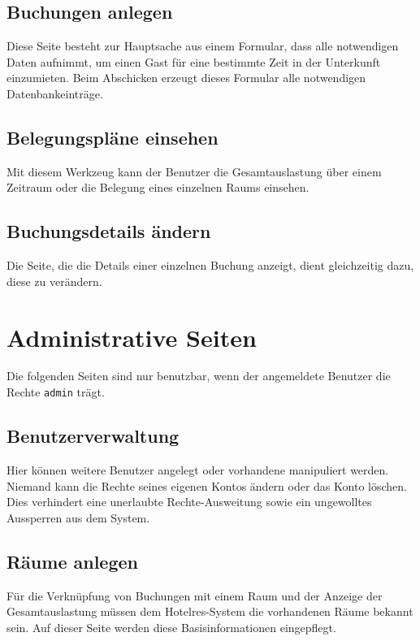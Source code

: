 \documentclass[a4paper,oneside,10pt]{scrreprt}
\begin{document}
\subsection*{Buchungen anlegen}

Diese Seite besteht zur Hauptsache aus einem Formular, dass alle notwendigen Daten aufnimmt, um einen Gast für eine bestimmte Zeit in der Unterkunft einzumieten. Beim Abschicken erzeugt dieses Formular alle notwendigen Datenbankeinträge.

\subsection*{Belegungspläne einsehen}

Mit diesem Werkzeug kann der Benutzer die Gesamtauslastung über einem Zeitraum oder die Belegung eines einzelnen Raums einsehen.

\subsection*{Buchungsdetails ändern}

Die Seite, die die Details einer einzelnen Buchung anzeigt, dient gleichzeitig dazu, diese zu verändern.


\section{Administrative Seiten}

Die folgenden Seiten sind nur benutzbar, wenn der angemeldete Benutzer die Rechte \texttt{admin} trägt.

\subsection*{Benutzerverwaltung}

Hier können weitere Benutzer angelegt oder vorhandene manipuliert werden. Niemand kann die Rechte seines eigenen Kontos ändern oder das Konto löschen. Dies verhindert eine unerlaubte Rechte-Ausweitung sowie ein ungewolltes Aussperren aus dem System.

\subsection*{Räume anlegen}

Für die Verknüpfung von Buchungen mit einem Raum und der Anzeige der Gesamtauslastung müssen dem Hotelres-System die vorhandenen Räume bekannt sein. Auf dieser Seite werden diese Basisinformationen eingepflegt.
\end{document}
